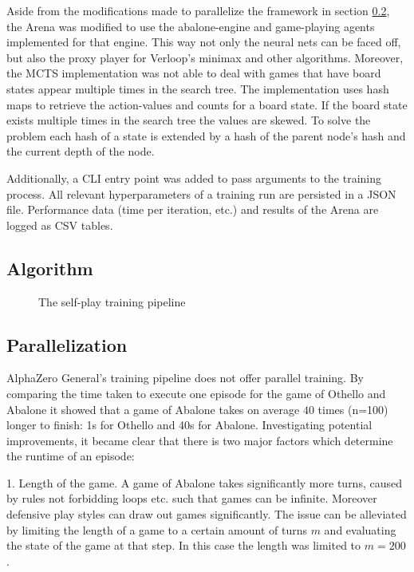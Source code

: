 Aside from the modifications made to parallelize the framework in section \ref{parallelization}, the Arena was modified to use the abalone-engine and game-playing agents implemented for that engine. This way not only the neural nets can be faced off, but also the proxy player for Verloop's minimax and other algorithms. Moreover, the MCTS implementation was not able to deal with games that have board states appear multiple times in the search tree. The implementation uses hash maps to retrieve the action-values and counts for a board state. If the board state exists multiple times in the search tree the values are skewed. To solve the problem each hash of a state is extended by a hash of the parent node's hash and the current depth of the node.

Additionally, a CLI entry point was added to pass arguments to the training process. All relevant hyperparameters of a training run are persisted in a JSON file. Performance data (time per iteration, etc.) and results of the Arena are logged as CSV tables.

\subsection{Algorithm}

\begin{figure}[H]
    \centering
    \caption{The self-play training pipeline}
    \label{training_algorithm}
\end{figure}

\subsection{Parallelization}
\label{parallelization}
AlphaZero General's training pipeline does not offer parallel training. By comparing the time taken to execute one episode for the game of Othello and Abalone it showed that a game of Abalone takes on average $40$ times (n=100) longer to finish: 1s for Othello and 40s for Abalone. Investigating potential improvements, it became clear that there is two major factors which determine the runtime of an episode:

1. Length of the game. A game of Abalone takes significantly more turns, caused by rules not forbidding loops etc. such that games can be infinite. Moreover defensive play styles can draw out games significantly. The issue can be alleviated by limiting the length of a game to a certain amount of turns $m$ and evaluating the state of the game at that step. In this case the length was limited to $m=200$.

